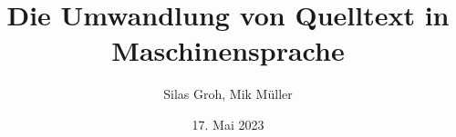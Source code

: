 




\captionsetup{labelformat=empty}
\NewCommandCopy{\oldLirsting}{\Lirsting}
\renewcommand{\Lirsting}[2][]{\oldLirsting[path prefix={deps/rush},vspace=0pt,#1]{#2}}



\title{Die Umwandlung von Quelltext in Maschinensprache}
\date{17. Mai 2023}
\author{Silas Groh, Mik Müller}



\begin{frame}
	\titlepage
\end{frame}














%

